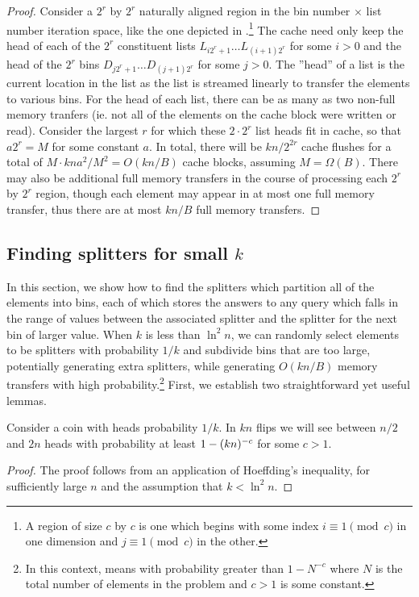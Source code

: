 \begin{proof}
Consider a $2^r$ by $2^r$ naturally aligned region in the bin number $\times$ list
number iteration space, like the one depicted in 
.\footnote{A  region
of size $c$ by $c$ is one which begins with some index $i \equiv 1 \pmod{c}$ 
in one dimension and $j \equiv 1 \pmod{c}$ in the other.}  
The cache need only keep the head of each of the $2^r$ constituent
lists $L_{i2^r + 1} \ldots L_{(i+1)2^r}$ for some $i>0$ and the head of the $2^r$ bins 
$D_{j2^r + 1} \ldots D_{(j+1)2^r}$ for some $j>0$. 
The ''head'' of a list is the current location
in the list as the list is streamed linearly to transfer the elements to various bins.  
For the head of each list, there can be as many as
two non-full memory tranfers (ie. not all of the elements on the cache block were
written or read).  Consider the largest $r$ for which these $2 \cdot 2^r$ list heads
fit in cache, so that $a2^r = M$ for some constant $a$.  In total, there will be 
$kn/2^{2r}$ cache flushes for a total of $M \cdot kna^2/M^2 = O(kn/B)$ cache blocks, 
assuming $M = \Omega(B)$.  There may also be additional full memory transfers in the
course of processing each $2^r$ by $2^r$ region, though
each element may appear in at most one full memory transfer, thus there are at most
$kn/B$ full memory transfers.  
\end{proof}

\subsection*{Finding splitters for small $k$}

In this section, we show how to find the splitters
which partition all of the elements into bins, each of which stores the answers to any
query which falls in the range of values between the associated splitter and the
splitter for the next bin of larger value.
When $k$ is less than $\ln^2 n$, we can randomly select elements to be splitters
with probability $1/k$ and subdivide bins that are too large, potentially generating
extra splitters, while generating $O(kn/B)$ memory transfers with high
probability.\footnote{In this context, 
 means with probability greater
than $1-N^{-c}$ where $N$ is the total number of elements in the problem and $c > 1$
is some constant.} First, we establish two straightforward yet useful lemmas.

\begin{lemma}
  Consider a coin with heads probability $1/k$.  In $kn$ flips we will see
  between $n/2$ and $2n$ heads with probability at least $1-\mathopen{}\left(kn\right)\mathclose{}^{-c}$ for some $c>1$.
  \label{lem:number_of_flips}
\end{lemma}
\begin{proof}
  The proof follows from an application of Hoeffding's inequality, for sufficiently
  large $n$ and the assumption that $k < \ln ^2 n$.
\end{proof}

